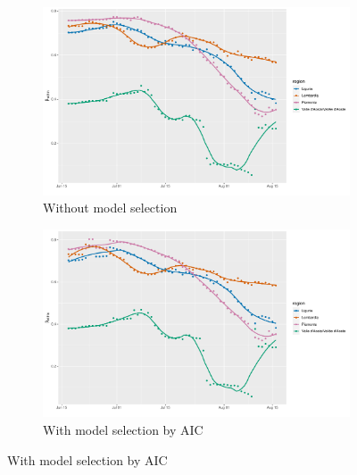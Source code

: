 \documentclass[12pt]{article}
\begin{document}
\begin{appendices}
		\begin{figure}[H]
    	    \centering
    	    \begin{subfigure}{\textwidth}
    	      \centering
    	      \includegraphics[width=0.91\linewidth]{output/model_within_lag14_betawithin_Nord-Ovest_rolling.pdf}
    	      \caption{Without model selection}
    	      \label{fig:beta_within_over_time_northwest_regular}
    	    \end{subfigure}\newline
    	    \begin{subfigure}{\textwidth}
    	      \centering
    	      \includegraphics[width=0.91\linewidth]{output/model_within_lag14_betawithin_Nord-Ovest_aic_rolling.pdf}
    	      \caption{With model selection by AIC}
    	      \label{fig:beta_within_over_time_northwest_aic}
    	    \end{subfigure}
        \end{figure}
        \begin{figure}[H]\ContinuedFloat
    	    \begin{subfigure}{\textwidth}
    	      \centering

\end{subfigure}
\end{figure}
\end{appendices}
\end{document}
